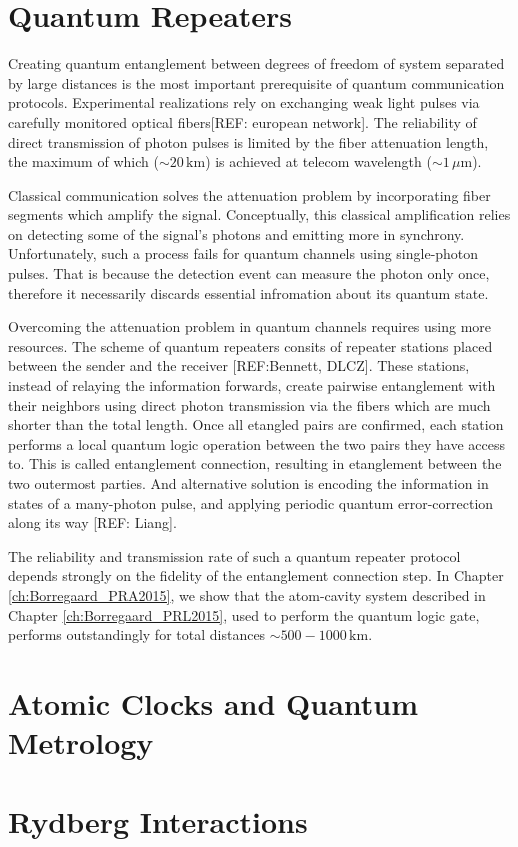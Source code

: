\section{Quantum Repeaters}
Creating quantum entanglement between degrees of freedom of system separated by
large distances is the most important prerequisite of quantum communication
protocols. Experimental realizations rely on exchanging weak light pulses
via carefully monitored optical fibers[REF: european network]. The
reliability of direct transmission of photon pulses is limited by the
fiber attenuation length, the maximum of which ($\sim 20\,\mathrm{km}$) is
achieved at telecom wavelength ($\sim 1\,\mu\mathrm{m}$).

Classical communication solves the attenuation problem by incorporating fiber
segments which amplify the signal. Conceptually, this classical amplification
relies on detecting some of the signal's photons and emitting more in synchrony.
Unfortunately, such a process fails for quantum channels using single-photon
pulses. That is because the detection event can measure the photon only once,
therefore it necessarily discards essential infromation about its quantum state.

Overcoming the attenuation problem in quantum channels requires using more
resources. The scheme of quantum repeaters consits of repeater stations placed
between the sender and the receiver [REF:Bennett, DLCZ].
These stations, instead of relaying the information forwards, create pairwise
entanglement with their neighbors using direct photon transmission via the
fibers which are much shorter than the total length. Once all etangled pairs are
confirmed, each station performs a local quantum logic operation between the two
pairs they have access to. This is called entanglement connection, resulting in
etanglement between the two outermost parties. And alternative solution is
encoding the information in states of a many-photon pulse, and applying periodic
quantum error-correction along its way [REF: Liang].

The reliability and transmission rate of such a quantum repeater protocol
depends strongly on the fidelity of the entanglement connection step. In Chapter
\ref{ch:Borregaard_PRA2015}, we show that the atom-cavity system described in
Chapter \ref{ch:Borregaard_PRL2015}, used to perform the quantum logic gate,
performs outstandingly for total distances $\sim
500-1000\,\mathrm{km}$.



\section{Atomic Clocks and Quantum Metrology}


\section{Rydberg Interactions}



